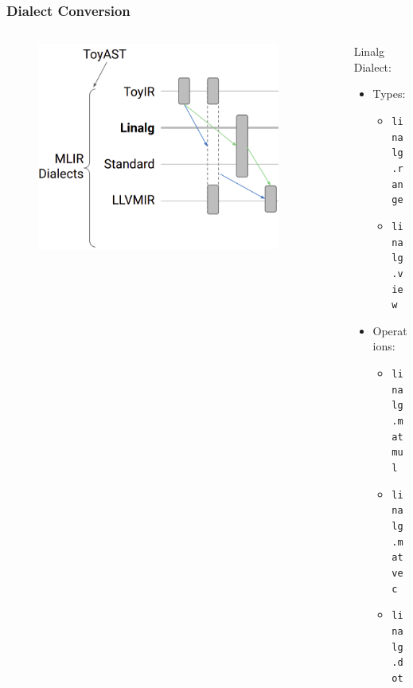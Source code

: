 \documentclass{beamer}
\begin{document}
\begin{frame}
  \frametitle{Dialect Conversion}
  \begin{columns}
    \begin{column}{0.5\textwidth}
      \begin{figure}[h]
        \centering
        \includegraphics[width=0.9\textwidth]{pictures/DialectConversions.png}
      \end{figure}
    \end{column}
    \begin{column}{0.5\textwidth}
      {
        Linalg Dialect: 
        \vspace{0.2cm}
        \begin{itemize}
          \item Types:
            {\scriptsize
              \begin{itemize}
                \itemsep0.4em
                \item \texttt{linalg.range}
                \item \texttt{linalg.view}
              \end{itemize}
            }
          \vspace{0.2cm}
          \item Operations:
            {\scriptsize
              \begin{itemize}
                \itemsep0.4em 
                \item \texttt{linalg.matmul}
                \item \texttt{linalg.matvec}
                \item \texttt{linalg.dot}

\end{itemize}}
\end{itemize}}
\end{column}
\end{columns}
\end{frame}
\end{document}
